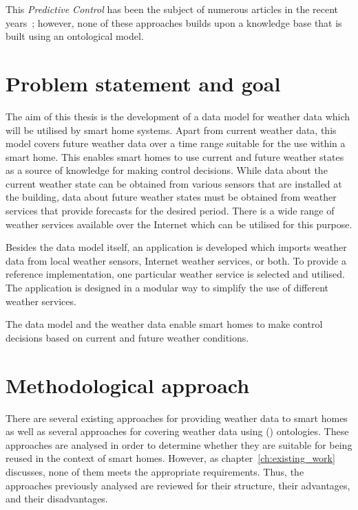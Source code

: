 This \emph{Predictive Control} has been the subject of numerous articles in the recent years~\cite{predictive_control1,predictive_control2,predictive_control3}; however, none of these approaches builds upon a knowledge base that is built using an ontological model.

\section{Problem statement and goal}

The aim of this thesis is the development of a data model for weather data which will be utilised by smart home systems. Apart from current weather data, this model covers future weather data over a time range suitable for the use within a smart home. This enables smart homes to use current and future weather states as a source of knowledge for making control decisions. While data about the current weather state can be obtained from various sensors that are installed at the building, data about future weather states must be obtained from weather services that provide forecasts for the desired period. There is a wide range of weather services available over the Internet which can be utilised for this purpose.

Besides the data model itself, an application is developed which imports weather data from local weather sensors, Internet weather services, or both. To provide a reference implementation, one particular weather service is selected and utilised. The application is designed in a modular way to simplify the use of different weather services.

The data model and the weather data enable smart homes to make control decisions based on current and future weather conditions.

\section{Methodological approach}

There are several existing approaches for providing weather data to smart homes as well as several approaches for covering weather data using () ontologies. These approaches are analysed in order to determine whether they are suitable for being reused in the context of smart homes. However, as chapter~\ref{ch:existing_work} discusses, none of them meets the appropriate requirements. Thus, the approaches previously analysed are reviewed for their structure, their advantages, and their disadvantages.

